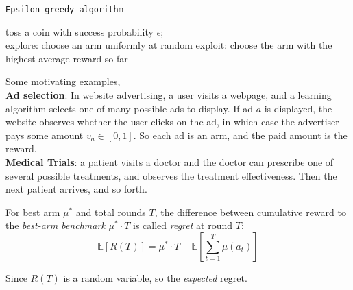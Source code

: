 \begin{algorithm}[H]
	\caption{\texttt{Epsilon-greedy algorithm}}
	{
		toss a coin with success probability $\epsilon$;\\
		{
			explore: choose an arm uniformly at random
		}
		{
			exploit: choose the arm with the highest average reward so far
		}
	}
\end{algorithm}
Some motivating examples,\\
\textbf{Ad selection}: In website\textcolor{white}{"}advertising, a user visits a webpage, and a learning algorithm selects one of many possible ads to display. If ad $a$ is displayed, the website observes whether the user clicks on the ad, in which case the advertiser pays some amount $v_a \in [0, 1]$. So each ad is an arm, and the paid amount is the reward.\\
\textbf{Medical Trials}: a patient visits a doctor and the doctor can prescribe one of several possible treatments, and observes the treatment effectiveness. Then the next patient arrives, and so forth.\textcolor{white}{"}
\begin{definition}
	For best arm $\mu^*$ and total rounds $T$, the difference between cumulative reward to the \textit{best-arm benchmark} $\mu^* \cdot T$ is called \textit{regret} at round $T$:
	$$ \mathbb{E}\left[ R(T)\right]  = \mu^* \cdot T - \mathbb{E} \left[ \sum_{t=1}^{T}\mu(a_t) \right] $$
\end{definition}
Since $R(T)$ is a random variable, so the \textit{expected} regret.

